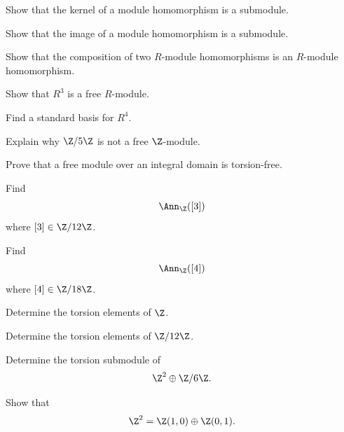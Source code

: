 \begin{exercise}[2]
Show that the kernel of a module homomorphism is a submodule.
\end{exercise}

\begin{exercise}[2]
Show that the image of a module homomorphism is a submodule.
\end{exercise}

\begin{exercise}[2]
Show that the composition of two \(R\)-module homomorphisms is an
\(R\)-module homomorphism.
\end{exercise}

\begin{exercise}[1]
Show that \(R^3\) is a free \(R\)-module.
\end{exercise}

\begin{exercise}[1]
Find a standard basis for \(R^4\).
\end{exercise}

\begin{exercise}[2]
Explain why \(\Z/5\Z\) is not a free \(\Z\)-module.
\end{exercise}

\begin{exercise}[2]
Prove that a free module over an integral domain is torsion-free.
\end{exercise}

\begin{exercise}[1]
Find
\[ \Ann_{\Z}([3]) \]
where \([3]\in\Z/12\Z\).
\end{exercise}

\begin{exercise}[2]
Find
\[ \Ann_{\Z}([4]) \]
where \([4]\in\Z/18\Z\).
\end{exercise}

\begin{exercise}[1]
Determine the torsion elements of \(\Z\).
\end{exercise}

\begin{exercise}[1]
Determine the torsion elements of \(\Z/12\Z\).
\end{exercise}

\begin{exercise}[2]
Determine the torsion submodule of
\[ \Z^2\oplus\Z/6\Z. \]
\end{exercise}

\begin{exercise}[2]
Show that
\[ \Z^2=\Z(1,0)\oplus\Z(0,1). \]
\end{exercise}

